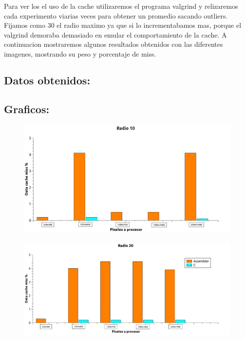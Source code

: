 Para ver los el uso de la cache utilizaremos el programa valgrind y relizaremos cada experimento viarias veces para obtener un promedio sacando outliers. Fijamos como 30 el radio maximo ya que si lo incrementabamos mas, porque el  valgrind demoraba demasiado en emular el comportamiento de la cache. A continuacion mostraremos algunos resultados obtenidos con las diferentes imagenes, mostrando su peso y porcentaje de miss. \\

\subsection{Datos obtenidos:}



\subsection{Graficos:} 


\begin{figure}[H]
\begin{center}
  \includegraphics[width=\linewidth]{cache/Radio10.png}
\end{center}
\end{figure}

\begin{figure}[H]
\begin{center}
  \includegraphics[width=\linewidth]{cache/Radio20.pdf}
\end{center}
\end{figure}

